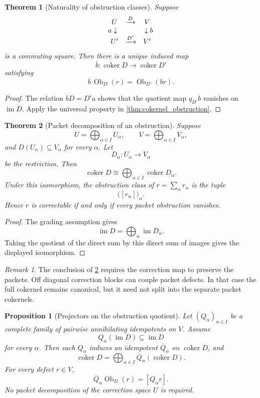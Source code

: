 \documentclass[11pt,a4paper]{article}
\newtheorem{theorem}{Theorem}[section]
\theoremstyle{plain}
\newtheorem{proposition}[proposition]{Proposition}
\theoremstyle{definition}
\theoremstyle{remark}
\newtheorem{remark}[remark]{Remark}
\newcommand{\im}{\operatorname{im}}
\newcommand{\Ob}{\operatorname{Ob}}
\newcommand{\coker}{\operatorname{coker}}
\begin{document}
\begin{theorem}[Naturality of obstruction classes]\label{thm:obstruction_naturality}
Suppose
\[
\begin{array}{ccc}
U & \xrightarrow{D} & V\\
\mathllap{a}\downarrow & & \downarrow\mathrlap{b}\\
U' & \xrightarrow{D'} & V'
\end{array}
\]
is a commuting square.  Then there is a unique induced map
\[
\overline b:\coker D\longrightarrow\coker D'
\]
satisfying
\[
\overline b\,\Ob_D(r)=\Ob_{D'}(br).
\]
\end{theorem}

\begin{proof}
The relation $bD=D'a$ shows that the quotient map $q_{D'}b$ vanishes on $\im D$.  Apply the universal property in \cref{thm:cokernel_obstruction}.
\end{proof}

\begin{theorem}[Packet decomposition of an obstruction]\label{thm:packet_obstruction_decomposition}
Suppose
\[
U=\bigoplus_{\alpha\in I}U_\alpha,
\qquad
V=\bigoplus_{\alpha\in I}V_\alpha,
\]
and $D(U_\alpha)\subseteq V_\alpha$ for every $\alpha$.  Let
\[
D_\alpha:U_\alpha\longrightarrow V_\alpha
\]
be the restriction.  Then
\[
\coker D
\cong
\bigoplus_{\alpha\in I}\coker D_\alpha.
\]
Under this isomorphism, the obstruction class of $r=\sum_\alpha r_\alpha$ is the tuple
\[
\big([r_\alpha]\big)_\alpha.
\]
Hence $r$ is correctable if and only if every packet obstruction vanishes.
\end{theorem}

\begin{proof}
The grading assumption gives
\[
\im D=\bigoplus_\alpha\im D_\alpha.
\]
Taking the quotient of the direct sum by this direct sum of images gives the displayed isomorphism.
\end{proof}

\begin{remark}\label{rem:block_diagonal_needed}
The conclusion of \cref{thm:packet_obstruction_decomposition} requires the correction map to preserve the packets.  Off diagonal correction blocks can couple packet defects.  In that case the full cokernel remains canonical, but it need not split into the separate packet cokernels.
\end{remark}

\begin{proposition}[Projectors on the obstruction quotient]\label{prop:obstruction_quotient_projectors}
Let $(Q_\alpha)_{\alpha\in I}$ be a complete family of pairwise annihilating idempotents on $V$.  Assume
\[
Q_\alpha(\im D)\subseteq\im D
\]
for every $\alpha$.  Then each $Q_\alpha$ induces an idempotent $\overline Q_\alpha$ on $\coker D$, and
\[
\coker D
=
\bigoplus_{\alpha\in I}\overline Q_\alpha(\coker D).
\]
For every defect $r\in V$,
\[
\overline Q_\alpha\Ob_D(r)
=
[Q_\alpha r].
\]
No packet decomposition of the correction space $U$ is required.
\end{proposition}
\end{document}
